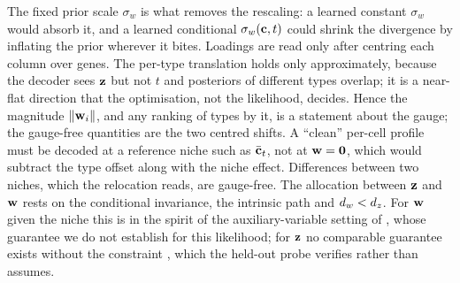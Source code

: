 \noindent The fixed prior scale $\sigma_w$ is what removes the rescaling: a learned constant $\sigma_w$ would absorb it, and a learned conditional $\sigma_w(\mathbf{c}, t)$ could shrink the divergence by inflating the prior wherever it bites. Loadings are read only after centring each column over genes. The per-type translation holds only approximately, because the decoder sees $\mathbf{z}$ but not $t$ and posteriors of different types overlap; it is a near-flat direction that the optimisation, not the likelihood, decides. Hence the magnitude $\|\mathbf{w}_i\|$, and any ranking of types by it, is a statement about the gauge; the gauge-free quantities are the two centred shifts. A ``clean'' per-cell profile must be decoded at a reference niche such as $\bar{\mathbf{c}}_t$, not at $\mathbf{w} = \mathbf{0}$, which would subtract the type offset along with the niche effect. Differences between two niches, which the relocation reads, are gauge-free. The allocation between $\mathbf{z}$ and $\mathbf{w}$ rests on the conditional invariance, the intrinsic path and $d_w < d_z$. For $\mathbf{w}$ given the niche this is in the spirit of the auxiliary-variable setting of \citet{khemakhem2020}, whose guarantee we do not establish for this likelihood; for $\mathbf{z}$ no comparable guarantee exists without the constraint \citep{locatello2019}, which the held-out probe verifies rather than assumes.

